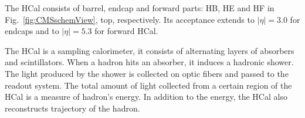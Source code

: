 The HCal consists of barrel, endcap and forward parts: HB, HE and HF in Fig.~\ref{fig:CMSschemView}, top, respectively. Its acceptance extends to $|\eta|=3.0$ for endcaps and to $|\eta|=5.3$ for forward HCal.

The HCal is a sampling calorimeter, it consists of alternating layers of absorbers and scintillators. When a hadron hits an absorber, it induces a hadronic shower. The light produced by the shower is collected on optic fibers and passed to the readout system. The total amount of light collected from a certain region of the HCal is a measure of hadron's energy. In addition to the energy, the HCal also reconstructs trajectory of the hadron.   





